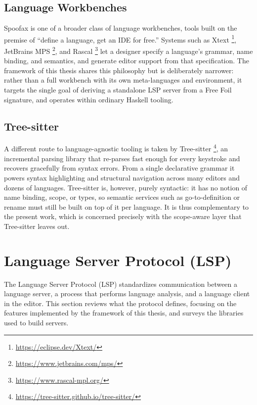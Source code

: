 \subsection{Language Workbenches}
\label{subsec:language-workbenches}

Spoofax is one of a broader class of language workbenches, tools built on the premise of ``define a language, get an IDE for free.'' Systems such as Xtext \footnote{\url{https://eclipse.dev/Xtext/}}, JetBrains MPS \footnote{\url{https://www.jetbrains.com/mps/}}, and Rascal \footnote{\url{https://www.rascal-mpl.org/}} let a designer specify a language's grammar, name binding, and semantics, and generate editor support from that specification. The framework of this thesis shares this philosophy but is deliberately narrower: rather than a full workbench with its own meta-languages and environment, it targets the single goal of deriving a standalone LSP server from a Free Foil signature, and operates within ordinary Haskell tooling.

\subsection{Tree-sitter}
\label{subsec:tree-sitter}

A different route to language-agnostic tooling is taken by Tree-sitter \footnote{\url{https://tree-sitter.github.io/tree-sitter/}}, an incremental parsing library that re-parses fast enough for every keystroke and recovers gracefully from syntax errors. From a single declarative grammar it powers syntax highlighting and structural navigation across many editors and dozens of languages. Tree-sitter is, however, purely syntactic: it has no notion of name binding, scope, or types, so semantic services such as go-to-definition or rename must still be built on top of it per language. It is thus complementary to the present work, which is concerned precisely with the scope-aware layer that Tree-sitter leaves out.

\section{Language Server Protocol (LSP)}
\label{sec:lsp}

The Language Server Protocol (LSP) \cite{lsp} standardizes communication between a language server, a process that performs language analysis, and a language client in the editor. 
This section reviews what the protocol defines, focusing on the features implemented by the framework of this thesis, and surveys the libraries used to build servers.

